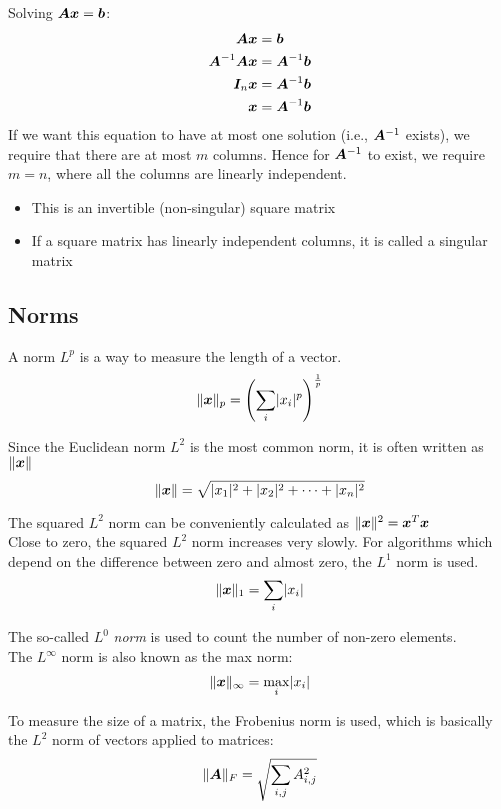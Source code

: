 \begin{multicols}{2}
	Solving $\bol{A}\bol{x}=\bol{b}$:
	\begin{align*}
		\bol{A}\bol{x} &= \bol{b}\\
		\bol{A}^{-1}\bol{A}\bol{x}&=\bol{A}^{-1}\bol{b}\\
		\bol{I}_n\bol{x}&=\bol{A}^{-1}\bol{b}\\
		\bol{x}&=\bol{A}^{-1}\bol{b}\\
	\end{align*}
	If we want this equation to have at most one solution (i.e., $\bol{A}^{-1}$ exists), we require that there are at most $m$ columns. Hence for $\bol{A}^{-1}$ to exist, we require $m=n$, where all the columns are linearly independent.
	\begin{itemize}
		\item This is an invertible (non-singular) square matrix
		\item If a square matrix has linearly independent columns, it is called a singular matrix
	\end{itemize}
	
	\subsection{Norms}
	A norm $L^p$ is a way to measure the length of a vector.
	\[ \lVert \bol{x} \rVert_p = \left( \sum_i \lvert x_i\rvert^p \right)^{\frac{1}{p}} \]
	
	Since the Euclidean norm $L^2$ is the most common norm, it is often written as $\lVert\bol{x}\rVert$
	\[ \lVert\bol{x}\rVert = \sqrt{\lvert x_1 \rvert^2 + \lvert x_2 \rvert^2 + \cdots + \lvert x_n \rvert^2} \]
	
	The squared $L^2$ norm can be conveniently calculated as $\lVert\bol{x}\rVert^2=\bol{x}^T\bol{x}$\\
	
	Close to zero, the squared $L^2$ norm increases very slowly. For algorithms which depend on the difference between zero and almost zero, the $L^1$ norm is used.
	\[ \lVert\bol{x}\rVert_1 = \sum_i \lvert x_i\rvert \]
	
	The so-called $L^0$ \textit{norm} is used to count the number of non-zero elements.\\
	
	The $L^\infty$ norm is also known as the max norm:
	\[ \lVert\bol{x}\rVert_\infty = \underset{i}{\max}\lvert x_i \rvert \]
	
	To measure the size of a matrix, the Frobenius norm is used, which is basically the $L^2$ norm of vectors applied to matrices:
	\[ \lVert \bol{A}\rVert_F = \sqrt{\sum_{i,j} A_{i,j}^2 }  \]
	

\end{multicols}

